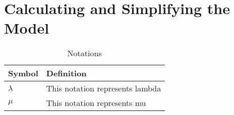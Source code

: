 
\section{Calculating and Simplifying the Model  }
\lipsum[11]

\begin{table}
	\begin{center}
	\begin{tabular}{|l l|}
		\hline
		Symbol & Definition \\
		\hline
		$\lambda$ & This notation represents lambda \\
		$\mu$ & This notation represents mu \\
		\hline
	\end{tabular}
	\caption{Notations}		
	\end{center}
\end{table}